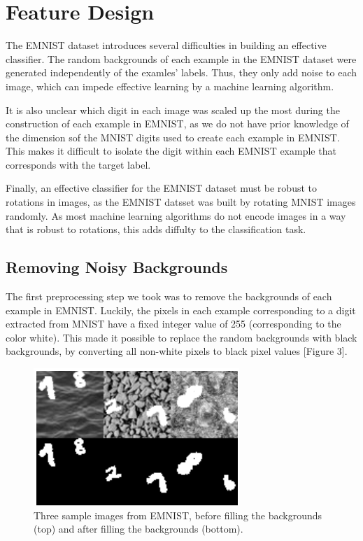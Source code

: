 \documentclass[letterpaper, 10 pt, conference]{ieeeconf}  %
\begin{document}
\section{Feature Design}

The EMNIST dataset introduces several difficulties in building an effective classifier. The random backgrounds of each example in the EMNIST dataset were generated independently of the examles' labels. Thus, they only add noise to each image, which can impede effective learning by a machine learning algorithm. 

It is also unclear which digit in each image was scaled up the most during the construction of each example in EMNIST, as we do not have prior knowledge of the dimension sof the MNIST digits used to create each example in EMNIST. This makes it difficult to isolate the digit within each EMNIST example that corresponds with the target label.

Finally, an effective classifier for the EMNIST dataset must be robust to rotations in images, as the EMNIST datsset was built by rotating MNIST images randomly. As most machine learning algorithms do not encode images in a way that is robust to rotations, this adds diffulty to the classification task. 

\subsection{Removing Noisy Backgrounds} 

The first preprocessing step we took was to remove the backgrounds of each example in EMNIST. Luckily, the pixels in each example corresponding to a digit extracted from MNIST have a fixed integer value of 255 (corresponding to the color white). This made it possible to replace the random backgrounds with black backgrounds, by converting all non-white pixels to black pixel values [Figure 3].
\begin{figure}[H]
      \centering
      \includegraphics[scale = 1]{blackout}
		\centering
      \caption{Three sample images from EMNIST, before filling the backgrounds (top) and after filling the backgrounds (bottom).}
      \label{figurelabel}
   \end{figure}
\end{document}
